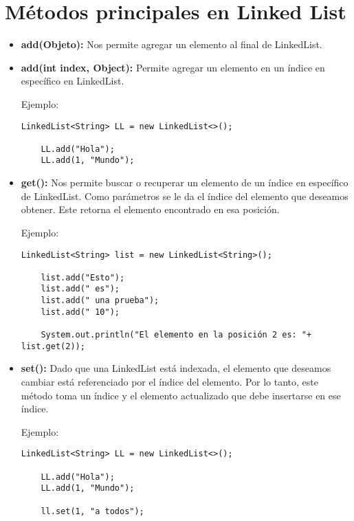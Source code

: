 \documentclass[12pt, letterpaper]{article} %
\begin{document}
\section*{Métodos principales en Linked List}
\begin{itemize}
    \item \textbf{add(Objeto):} Nos permite agregar un elemento al final de LinkedList.
    
    \item \textbf{add(int index, Object):} Permite agregar un elemento en un índice en específico en LinkedList.
    
    \lstset{language = Java, breaklines=true, basicstyle=\footnotesize}
    Ejemplo:
    \begin{lstlisting}[frame=single]
    LinkedList<String> LL = new LinkedList<>();

    LL.add("Hola");  
    LL.add(1, "Mundo");
    \end{lstlisting}
    
    \item \textbf{get():} Nos permite buscar o recuperar un elemento de un índice en específico de LinkedList. Como parámetros se le da el índice del elemento que deseamos obtener. Este retorna el elemento encontrado en esa posición.
    
    Ejemplo:
    \lstset{language = Java, breaklines=true, basicstyle=\footnotesize}
    \begin{lstlisting}[frame=single]
    LinkedList<String> list = new LinkedList<String>();

    list.add("Esto");
    list.add(" es");
    list.add(" una prueba");
    list.add(" 10");

    System.out.println("El elemento en la posición 2 es: "+ list.get(2));
    \end{lstlisting}
    
    \item \textbf{set():} Dado que una LinkedList está indexada, el elemento que deseamos cambiar está referenciado por el índice del elemento. Por lo tanto, este método toma un índice y el elemento actualizado que debe insertarse en ese índice.

    Ejemplo:
    \lstset{language = Java, breaklines=true, basicstyle=\footnotesize}
    \begin{lstlisting}[frame=single]
    LinkedList<String> LL = new LinkedList<>();

    LL.add("Hola");  
    LL.add(1, "Mundo");

    ll.set(1, "a todos");
    \end{lstlisting}
    

\end{itemize}
\end{document}
